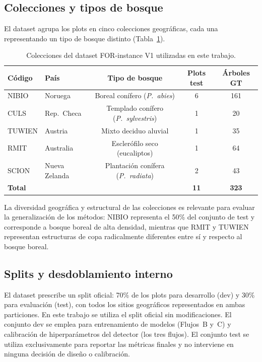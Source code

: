 \documentclass[runningheads]{llncs}
\begin{document}
\subsection{Colecciones y tipos de bosque}

El dataset agrupa los plots en cinco colecciones geogr\'aficas, cada una representando un tipo de bosque distinto (Tabla~\ref{tab:collections}).

\begin{table}[t]
\centering
\caption{Colecciones del dataset FOR-instance V1 utilizadas en este trabajo.}\label{tab:collections}
\begin{tabular}{llccc}
\toprule
C\'odigo & Pa\'is & Tipo de bosque & Plots test & \'Arboles GT \\
\midrule
NIBIO  & Noruega       & Boreal con\'ifero (\emph{P.~abies})        & 6 & 161 \\
CULS   & Rep.\ Checa   & Templado con\'ifero (\emph{P.~sylvestris}) & 1 &  20 \\
TUWIEN & Austria       & Mixto deciduo aluvial                      & 1 &  35 \\
RMIT   & Australia     & Escler\'ofilo seco (eucaliptos)             & 1 &  64 \\
SCION  & Nueva Zelanda & Plantaci\'on con\'ifera (\emph{P.~radiata}) & 2 &  43 \\
\midrule
\textbf{Total} & & & \textbf{11} & \textbf{323} \\
\bottomrule
\end{tabular}
\end{table}

La diversidad geogr\'afica y estructural de las colecciones es relevante para evaluar la generalizaci\'on de los m\'etodos: NIBIO representa el 50\% del conjunto de test y corresponde a bosque boreal de alta densidad, mientras que RMIT y TUWIEN representan estructuras de copa radicalmente diferentes entre s\'i y respecto al bosque boreal.

\subsection{Splits y desdoblamiento interno}\label{sec:splits}

El dataset prescribe un split oficial: 70\% de los plots para desarrollo (dev) y 30\% para evaluaci\'on (test), con todos los sitios geogr\'aficos representados en ambas particiones. En este trabajo se utiliza el split oficial sin modificaciones. El conjunto dev se emplea para entrenamiento de modelos (Flujos~B y~C) y calibraci\'on de hiperpar\'ametros del detector (los tres flujos). El conjunto test se utiliza exclusivamente para reportar las m\'etricas finales y no interviene en ninguna decisi\'on de dise\~no o calibraci\'on.
\end{document}
